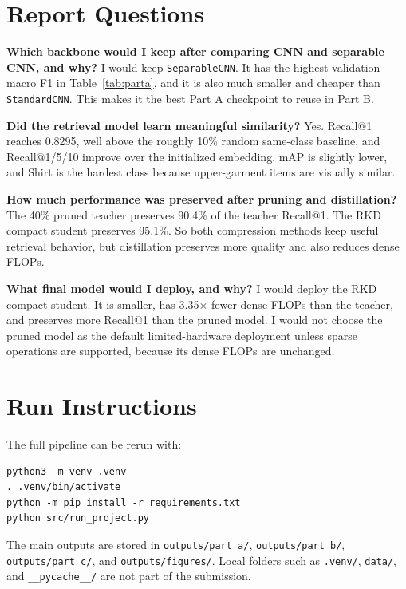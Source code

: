 \documentclass[11pt,a4paper]{article}
\newcommand{\model}[1]{\texttt{#1}}
\begin{document}
\section{Report Questions}

\textbf{Which backbone would I keep after comparing CNN and separable CNN, and why?}
I would keep \model{SeparableCNN}. It has the highest validation macro F1 in Table~\ref{tab:parta}, and it is also much smaller and cheaper than \model{StandardCNN}. This makes it the best Part A checkpoint to reuse in Part B.

\textbf{Did the retrieval model learn meaningful similarity?}
Yes. Recall@1 reaches 0.8295, well above the roughly 10\% random same-class baseline, and Recall@1/5/10 improve over the initialized embedding. mAP is slightly lower, and Shirt is the hardest class because upper-garment items are visually similar.

\textbf{How much performance was preserved after pruning and distillation?}
The 40\% pruned teacher preserves 90.4\% of the teacher Recall@1. The RKD compact student preserves 95.1\%. So both compression methods keep useful retrieval behavior, but distillation preserves more quality and also reduces dense FLOPs.

\textbf{What final model would I deploy, and why?}
I would deploy the RKD compact student. It is smaller, has 3.35$\times$ fewer dense FLOPs than the teacher, and preserves more Recall@1 than the pruned model. I would not choose the pruned model as the default limited-hardware deployment unless sparse operations are supported, because its dense FLOPs are unchanged.

\section{Run Instructions}

The full pipeline can be rerun with:

\begin{verbatim}
python3 -m venv .venv
. .venv/bin/activate
python -m pip install -r requirements.txt
python src/run_project.py
\end{verbatim}

The main outputs are stored in \model{outputs/part\_a/}, \model{outputs/part\_b/}, \model{outputs/part\_c/}, and \model{outputs/figures/}. Local folders such as \model{.venv/}, \model{data/}, and \model{\_\_pycache\_\_/} are not part of the submission.



\end{document}
